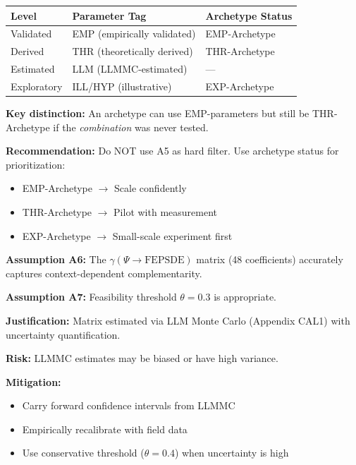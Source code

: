 \begin{tcolorbox}[colback=red!5!white, colframe=red!75!black,
    title=\textbf{Assumption A5: Empirical Evidence Requirement} $\triangleright$ \textit{Highest Risk}]
\begin{center}
\small
\renewcommand{\arraystretch}{1.2}
\begin{tabular}{@{}lll@{}}
\toprule
\textbf{Level} & \textbf{Parameter Tag} & \textbf{Archetype Status} \\
\midrule
Validated & EMP (empirically validated) & EMP-Archetype \\
Derived & THR (theoretically derived) & THR-Archetype \\
Estimated & LLM (LLMMC-estimated) & --- \\
Exploratory & ILL/HYP (illustrative) & EXP-Archetype \\
\bottomrule
\end{tabular}
\end{center}

\textbf{Key distinction:} An archetype can use EMP-parameters but still be THR-Archetype if the \textit{combination} was never tested.

\textbf{Recommendation:} Do NOT use A5 as hard filter. Use archetype status for prioritization:
\begin{itemize}[nosep]
\item EMP-Archetype $\rightarrow$ Scale confidently
\item THR-Archetype $\rightarrow$ Pilot with measurement
\item EXP-Archetype $\rightarrow$ Small-scale experiment first
\end{itemize}
\end{tcolorbox}

\begin{tcolorbox}[colback=yellow!5!white, colframe=yellow!75!black,
    title=\textbf{Assumptions A6--A7: $\gamma(\Psi)$ Context Filter}]
\textbf{Assumption A6:} The $\gamma(\Psi \rightarrow \text{FEPSDE})$ matrix (48 coefficients) accurately captures context-dependent complementarity.

\textbf{Assumption A7:} Feasibility threshold $\theta = 0.3$ is appropriate.

\textbf{Justification:} Matrix estimated via LLM Monte Carlo (Appendix CAL1) with uncertainty quantification.

\textbf{Risk:} LLMMC estimates may be biased or have high variance.

\textbf{Mitigation:}
\begin{itemize}[nosep]
\item Carry forward confidence intervals from LLMMC
\item Empirically recalibrate with field data
\item Use conservative threshold ($\theta = 0.4$) when uncertainty is high
\end{itemize}
\end{tcolorbox}

